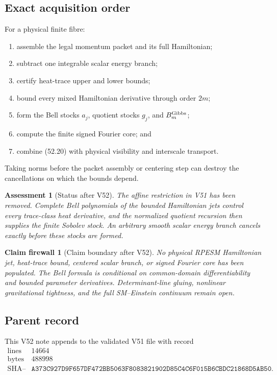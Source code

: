 \documentclass[11pt]{article}
\newtheorem{firewall}[theorem]{Claim firewall}
\newtheorem{assessment}[theorem]{Assessment}
\theoremstyle{remark}
\begin{document}
\subsection{Exact acquisition order}

For a physical finite fibre:
\begin{enumerate}
\item assemble the legal momentum packet and its full Hamiltonian;
\item subtract one integrable scalar energy branch;
\item certify heat-trace upper and lower bounds;
\item bound every mixed Hamiltonian derivative through order \(2m\);
\item form the Bell stocks \(a_j\), quotient stocks \(g_j\), and
\(B_m^{\rm Gibbs}\);
\item compute the finite signed Fourier core; and
\item combine (52.20) with physical visibility and interscale
transport.
\end{enumerate}

Taking norms before the packet assembly or centering step can destroy
the cancellations on which the bounds depend.

\begin{assessment}[Status after V52]
\label{ass:v12v52-status}
The affine restriction in V51 has been removed.  Complete Bell
polynomials of the bounded Hamiltonian jets control every
trace-class heat derivative, and the normalized quotient recursion
then supplies the finite Sobolev stock.  An arbitrary smooth scalar
energy branch cancels exactly before these stocks are formed.
\end{assessment}

\begin{firewall}[Claim boundary after V52]
\label{fire:v12v52-claim}
No physical RPESM Hamiltonian jet, heat-trace bound, centered scalar
branch, or signed Fourier core has been populated.  The Bell formula
is conditional on common-domain differentiability and bounded
parameter derivatives.  Determinant-line gluing, nonlinear
gravitational tightness, and the full SM--Einstein continuum remain
open.
\end{firewall}

\subsection{Parent record}

This V52 note appends to the validated V51 file with record
\[
\begin{array}{c|c}
\text{lines}&14664\\
\text{bytes}&488998\\
\text{SHA--256}&
\texttt{A373C927D9F657DF472BB5063F8083821902D85C4C6F015B6CBDC21868D5AB50}.
\end{array}
\]
\end{document}
